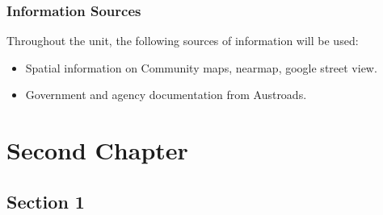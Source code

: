 \documentclass{report}
\begin{document}
	\subsection{Information Sources}
	Throughout the unit, the following sources of information will be used:
	\begin{itemize}
		\item Spatial information on Community maps, nearmap, google street view. 
		\item Government and agency documentation from Austroads. 
	\end{itemize}


	
	\newpage



	
\chapter{Second Chapter}
\section{Section 1}
\end{document}
